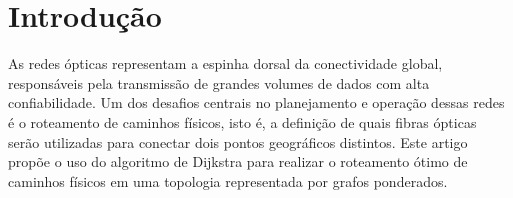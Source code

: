 \section{Introdução}

As redes ópticas representam a espinha dorsal da conectividade global,
responsáveis pela transmissão de grandes volumes de dados com alta
confiabilidade. Um dos desafios centrais no planejamento e operação dessas
redes é o roteamento de caminhos físicos, isto é, a definição de quais fibras
ópticas serão utilizadas para conectar dois pontos geográficos distintos. Este
artigo propõe o uso do algoritmo de Dijkstra para realizar o roteamento ótimo
de caminhos físicos em uma topologia representada por grafos ponderados.

